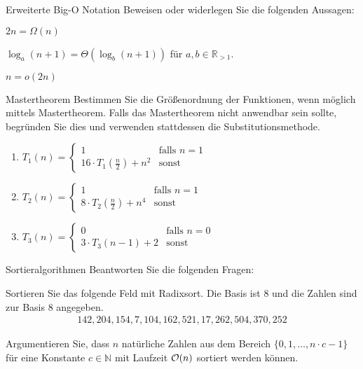 \documentclass{exercisesheet}
\begin{document}
\newpage\setcounter{section}{2}\setcounter{subsection}{0}
\begin{eexercises}{Erweiterte Big-O Notation}{
    Beweisen oder widerlegen Sie die folgenden Aussagen:
  }
  \item $2n = \Omega(n)$
  \item $\log_a(n+1) = \Theta(\log_b(n+1))$ für $a,b \in \mathbb{R}_{>1}$.
  \item $n = o(2n)$
\end{eexercises}

\begin{exercise}{Mastertheorem}\setcounter{subsection}{0}
  Bestimmen Sie die Größenordnung der Funktionen, wenn möglich mittels Mastertheorem. Falls das Mastertheorem nicht anwendbar sein sollte, begründen Sie dies und verwenden stattdessen die Substitutionsmethode.
  \begin{enumerate}
    \item $T_1(n) = \begin{cases}
              1                               & \text{falls } n = 1 \\
              16 \cdot T_1(\frac{n}{2}) + n^2 & \text{sonst}
            \end{cases}$
    \item $T_2(n) = \begin{cases}
              1                              & \text{falls } n = 1 \\
              8 \cdot T_2(\frac{n}{2}) + n^4 & \text{sonst}
            \end{cases}$
    \item $T_3(n) = \begin{cases}
              0                    & \text{falls } n = 0 \\
              3 \cdot T_3(n-1) + 2 & \text{sonst}
            \end{cases}$
  \end{enumerate}
\end{exercise}

\newpage\setcounter{section}{3}\setcounter{subsection}{0}
\begin{eexercises}{Sortieralgorithmen}{
    Beantworten Sie die folgenden Fragen:
  }
  \item Sortieren Sie das folgende Feld mit Radixsort. Die Basis ist 8 und die Zahlen sind zur Basis 8 angegeben.
  \begin{align*}
    142, 204, 154, 7, 104, 162, 521, 17, 262, 504, 370, 252
  \end{align*}
  \item Argumentieren Sie, dass $n$ natürliche Zahlen aus dem Bereich $\{0, 1, \ldots, n \cdot c - 1\}$ für eine Konstante $c \in \mathbb{N}$ mit Laufzeit $\mathcal{O}(n)$ sortiert werden können.
\end{eexercises}
\end{document}
